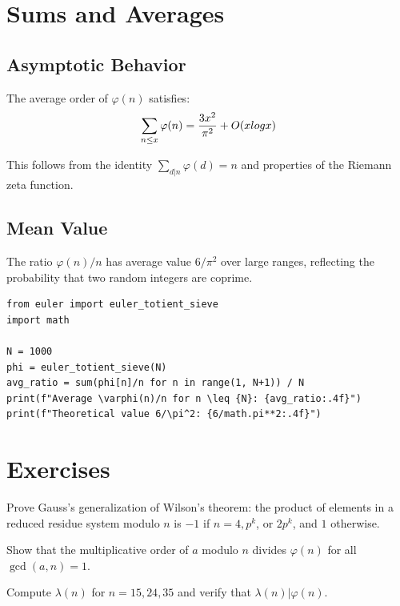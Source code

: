 \section{Sums and Averages}

\subsection{Asymptotic Behavior}

The average order of $\varphi(n)$ satisfies:
\[
\sum_{n \leq x} \varphi(n) = \frac{3x^2}{\pi^2} + O(x \\log x)
\]

This follows from the identity $\sum_{d|n} \varphi(d) = n$ and properties of the Riemann zeta function.

\subsection{Mean Value}

The ratio $\varphi(n)/n$ has average value $6/\pi^2$ over large ranges, reflecting the probability that two random integers are coprime.

\begin{lstlisting}[caption={Average totient values}, label=lst:avg_totient]
from euler import euler_totient_sieve
import math

N = 1000
phi = euler_totient_sieve(N)
avg_ratio = sum(phi[n]/n for n in range(1, N+1)) / N
print(f"Average \varphi(n)/n for n \leq {N}: {avg_ratio:.4f}")
print(f"Theoretical value 6/\pi^2: {6/math.pi**2:.4f}")
\end{lstlisting}

\section{Exercises}

\begin{exercise}
Prove Gauss's generalization of Wilson's theorem: the product of elements in a reduced residue system modulo $n$ is $-1$ if $n = 4, p^k$, or $2p^k$, and $1$ otherwise.
\end{exercise}

\begin{exercise}
Show that the multiplicative order of $a$ modulo $n$ divides $\varphi(n)$ for all $\gcd(a,n) = 1$.
\end{exercise}

\begin{exercise}
Compute $\lambda(n)$ for $n = 15, 24, 35$ and verify that $\lambda(n) | \varphi(n)$.
\end{exercise}

